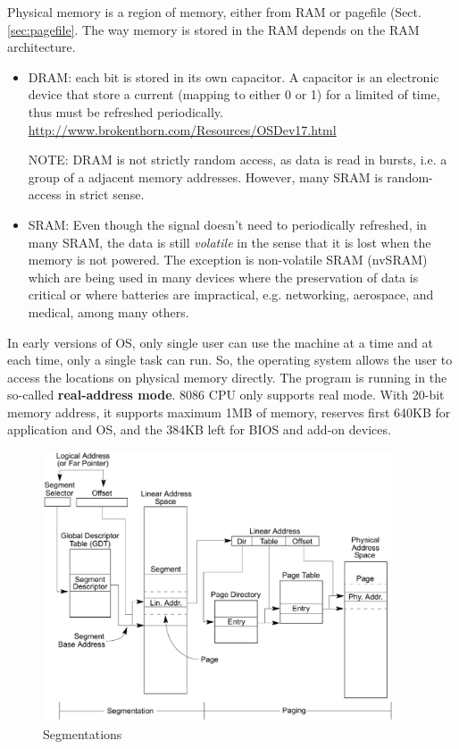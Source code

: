 Physical memory is a region of memory, either from RAM or pagefile
(Sect.\ref{sec:pagefile}.  The way memory is stored in the RAM depends
on the RAM architecture.
\begin{itemize}
  \item DRAM: each bit is stored in its own capacitor. A capacitor is an
  electronic device that store a current (mapping to either 0 or 1) for a
  limited of time, thus must be refreshed periodically. 
  \url{http://www.brokenthorn.com/Resources/OSDev17.html}
  
  NOTE: DRAM is not strictly random access, as data is read in bursts, i.e. a
  group of a adjacent memory addresses. However, many SRAM is random-access in
  strict sense.
  
  \item SRAM: Even though the signal doesn't need to periodically refreshed, in
  many SRAM, the data is still {\it volatile} in the sense that it is lost when
  the memory is not powered. The exception is non-volatile SRAM (nvSRAM) which
  are being used in many devices where the preservation of data is critical or
  where batteries are impractical, e.g. networking, aerospace, and medical,
  among many others.
\end{itemize}

In early versions of OS, only single user can use the machine at a time and at
each time, only a single task can run. So, the operating system allows the user
to access the locations on physical memory directly. The program is running in
the so-called {\bf real-address mode}. 8086 CPU only supports real mode. With
20-bit memory address, it supports maximum 1MB of memory, reserves first 640KB
for application and OS, and the 384KB left for BIOS and add-on devices.
\begin{figure}[hbt]
  \centerline{\includegraphics[height=8cm,
    angle=0]{./images/memory_segment.eps}}
\caption{Segmentations}
\label{fig:memory_segment}
\end{figure}

